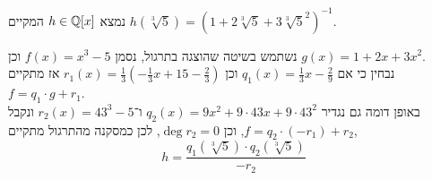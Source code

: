 \subquestion{}
נמצא $h \in \mathbb{Q}[x]$ המקיים $h(\sqrt[3]{5}) = {\left(1 + 2\sqrt[3]{5} + 3 {\sqrt[3]{5}}^2\right)}^{-1}$.
\begin{solution}
	נשתמש בשיטה שהוצגה בתרגול, נסמן $f(x) = x^3 - 5$ וכן $g(x) = 1 + 2x + 3x^2$. \\
	נבחין כי אם $q_1(x) = \frac{1}{3} x - \frac{2}{9}$ וכן $r_1(x) = \frac{1}{3} (-\frac{1}{3}x + 15 - \frac{2}{3})$ אז מתקיים $f = q_1 \cdot g + r_1$. \\
	באופן דומה גם נגדיר $q_2(x) = 9x^2 + 9 \cdot 43x + 9 \cdot 43^2$ ו־$r_2(x) = 43^3 - 5$ ונקבל $f = q_2 \cdot (-r_1) + r_2$, וכן $\deg r_2 = 0$, לכן כמסקנה מהתרגול מתקיים,
	\[
		h
		= \frac{q_1(\sqrt[3]{5}) \cdot q_2(\sqrt[3]{5})}{-r_2}
	\]
\end{solution}


